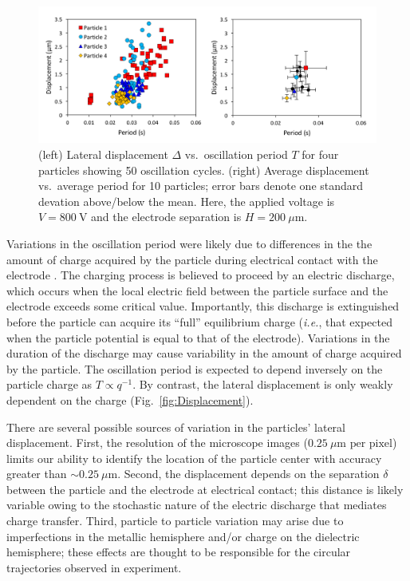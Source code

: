 \begin{appendices}
\begin{figure}[h]
    \centering
    \includegraphics[width=\textwidth]{figures/A1_VariationPlots.png}
    \caption{(left) Lateral displacement $\Delta$ vs.~oscillation period $T$ for four particles showing 50 oscillation cycles. (right) Average displacement vs.~average period for 10 particles; error bars denote one standard devation above/below the mean. Here, the applied voltage is $V=800~\text{V}$ and the electrode separation is $H=200~\mu\text{m}$.}
    \label{fig:Variations}
\end{figure}

Variations in the oscillation period were likely due to differences in the the amount of charge acquired by the particle during electrical contact with the electrode \cite{drews2015contact}.
The charging process is believed to proceed by an electric discharge, which occurs when the local electric field between the particle surface and the electrode exceeds some critical value.
Importantly, this discharge is extinguished before the particle can acquire its ``full'' equilibrium charge (\emph{i.e.}, that expected when the particle potential is equal to that of the electrode).
Variations in the duration of the discharge may cause variability in the amount of charge acquired by the particle.
The oscillation period is expected to depend inversely on the particle charge as $T\propto q^{-1}$.
By contrast, the lateral displacement is only weakly dependent on the charge (Fig.~\ref{fig:Displacement}).

There are several possible sources of variation in the particles' lateral displacement.
First, the resolution of the microscope images ($0.25~\mu\text{m per pixel}$) limits our ability to identify the location of the particle center with accuracy greater than ${\sim}0.25~\mu\text{m}$.
Second, the displacement depends on the separation $\delta$ between the particle and the electrode at electrical contact; this distance is likely variable owing to the stochastic nature of the electric discharge that mediates charge transfer.
Third, particle to particle variation may arise due to imperfections in the metallic hemisphere and/or charge on the dielectric hemisphere; these effects are thought to be responsible for the circular trajectories observed in experiment.


\end{appendices}
